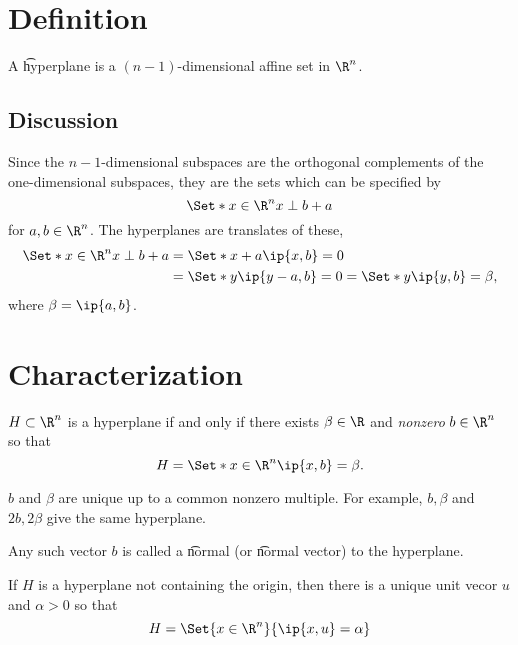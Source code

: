 
\section*{Definition}

A \t{hyperplane} is a $(n-1)$-dimensional affine set in $\R ^n$.

\subsection*{Discussion}

Since the $n-1$-dimensional subspaces are the orthogonal complements of the one-dimensional subspaces, they are the sets which can be specified by
\[
\Set*{x \in \R ^n}{x \perp  b} + a
\]
for $a, b \in \R ^n$.
The hyperplanes are translates of these,
\[
\begin{aligned}
\Set*{x \in \R ^n}{x \perp  b} + a &= \Set*{x + a}{\ip{x,b} = 0} \\
&= \Set*{y}{\ip{y - a,b} = 0} = \Set*{y}{\ip{y,b} = \beta }, \\
\end{aligned}
\]
where $\beta  = \ip{a,b}$.

\section*{Characterization}

\begin{proposition}
$H \subset \R ^n$ is a hyperplane if and only if there exists $\beta  \in \R $ and \textit{nonzero} $b \in \R ^n$ so that
\[
H = \Set*{x \in \R ^n}{\ip{x,b} = \beta }.
\]
\end{proposition}

\begin{remark}
$b$ and $\beta $ are unique up to a common nonzero multiple.
For example, $b, \beta $ and $2b, 2\beta $ give the same hyperplane.
\end{remark}

\begin{remark}
Any such vector $b$ is called a \t{normal} (or \t{normal vector}) to the hyperplane.
\end{remark}

\begin{remark}
If $H$ is a hyperplane not containing the origin, then there is a unique unit vecor $u$ and $\alpha  > 0$ so that
\[
H = \Set{x \in \R ^n}{\ip{x,u} = \alpha }
\]
\end{remark}

\blankpage